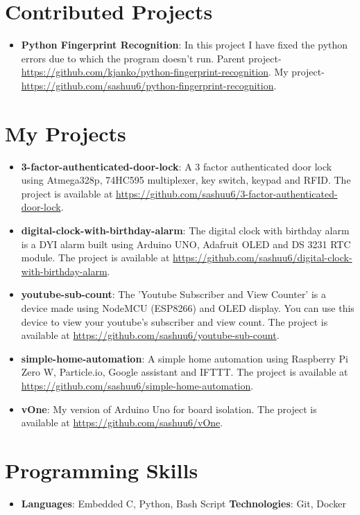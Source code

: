 \documentclass[letterpaper,11pt]{article}
\newcommand{\resumeItem}[2]{
  \item\small{
    \textbf{#1}{: #2 \vspace{-2pt}}
  }
}
\newcommand{\resumeSubItem}[2]{\resumeItem{#1}{#2}\vspace{-4pt}}
\newcommand{\resumeSubHeadingListStart}{\begin{itemize}[leftmargin=*]}
\newcommand{\resumeSubHeadingListEnd}{\end{itemize}}
\begin{document}
\section{Contributed Projects}
  \resumeSubHeadingListStart
    \resumeSubItem{Python Fingerprint Recognition}
      { In this project I have fixed the python errors due to which the program doesn't run. Parent project-\url{https://github.com/kjanko/python-fingerprint-recognition}. My project-\url{https://github.com/sashuu6/python-fingerprint-recognition}.}
  \resumeSubHeadingListEnd

\section{My Projects}
  \resumeSubHeadingListStart
    \resumeSubItem{3-factor-authenticated-door-lock}
      { A 3 factor authenticated door lock using Atmega328p, 74HC595 multiplexer, key switch, keypad and RFID. The project is available at \url{https://github.com/sashuu6/3-factor-authenticated-door-lock}.}
    \resumeSubItem{digital-clock-with-birthday-alarm}
      {The digital clock with birthday alarm is a DYI alarm built using Arduino UNO, Adafruit OLED and DS 3231 RTC module. The project is available at \url{https://github.com/sashuu6/digital-clock-with-birthday-alarm}.}
    \resumeSubItem{youtube-sub-count}
      {The 'Youtube Subscriber and View Counter' is a device made using NodeMCU (ESP8266) and OLED display. You can use this device to view your youtube's subscriber and view count. The project is available at \url{https://github.com/sashuu6/youtube-sub-count}.}
    \resumeSubItem{simple-home-automation}
      {A simple home automation using Raspberry Pi Zero W, Particle.io, Google assistant and IFTTT. The project is available at \url{https://github.com/sashuu6/simple-home-automation}.}
      \resumeSubItem{vOne}
      {My version of Arduino Uno for board isolation. The project is available at \url{https://github.com/sashuu6/vOne}.}
  \resumeSubHeadingListEnd

\section{Programming Skills}
  \resumeSubHeadingListStart
    \item{
      \textbf{Languages}{: Embedded C, Python, Bash Script}
      \hfill
      \textbf{Technologies}{: Git, Docker }
    }
  \resumeSubHeadingListEnd

\end{document}
